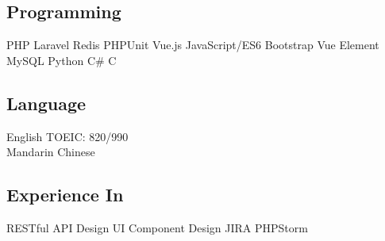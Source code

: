 \documentclass[letterpaper]{deedy-resume} %
\begin{document}
\begin{minipage}[t]{0.33\textwidth}
\subsection{Programming}

PHP \textbullet{} Laravel \textbullet{} Redis \textbullet{} PHPUnit \textbullet{} Vue.js \textbullet{} JavaScript/ES6 \textbullet{} Bootstrap Vue \textbullet{} Element \textbullet{} MySQL\textbullet{} Python \textbullet{} C{\#} \textbullet{} C \\  


\subsection{Language}

English TOEIC: 820/990 \\
Mandarin Chinese

\subsection{Experience In}

RESTful API Design \textbullet{} UI Component Design \textbullet{} JIRA \textbullet{} PHPStorm

\sectionspace %


\end{minipage} %
\hfill
%
%
\end{document}
